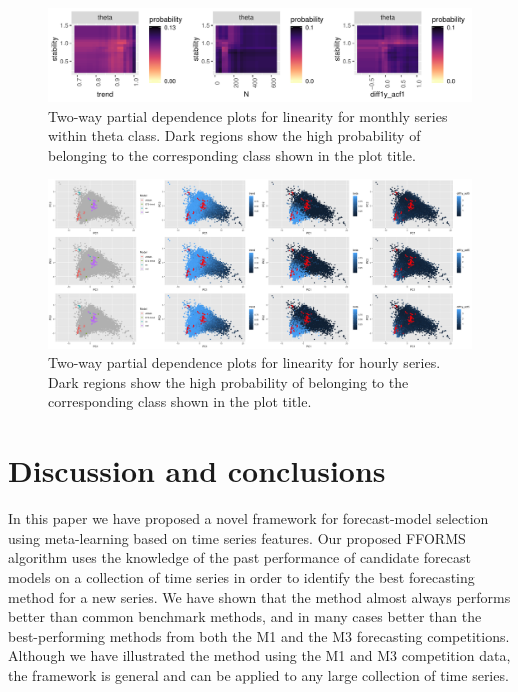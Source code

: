 \documentclass[11pt,a4paper,]{article}
\begin{document}
\begin{figure}[h]

{\centering \includegraphics[width=\textwidth]{figure/thetapdp-1} 

}

\caption{Two-way partial dependence plots for linearity for monthly series within theta class. Dark regions show the high probability of belonging to the corresponding class shown in the plot title.}\label{fig:thetapdp}
\end{figure}

\begin{figure}[h]

{\centering \includegraphics[width=\textwidth]{figure/pcayearly-1} 

}

\caption{Two-way partial dependence plots for linearity for hourly series. Dark regions show the high probability of belonging to the corresponding class shown in the plot title.}\label{fig:pcayearly}
\end{figure}

\clearpage

\hypertarget{discussion}{%
\section{Discussion and conclusions}\label{discussion}}

In this paper we have proposed a novel framework for forecast-model selection using meta-learning based on time series features. Our proposed FFORMS algorithm uses the knowledge of the past performance of candidate forecast models on a collection of time series in order to identify the best forecasting method for a new series. We have shown that the method almost always performs better than common benchmark methods, and in many cases better than the best-performing methods from both the M1 and the M3 forecasting competitions. Although we have illustrated the method using the M1 and M3 competition data, the framework is general and can be applied to any large collection of time series.
\end{document}
